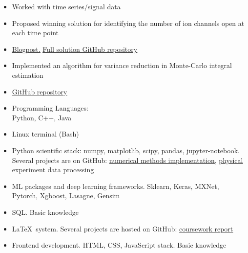 

\begin{itemize}
	\item Worked with time series/signal data
	\item Proposed winning solution for identifying the number of ion channels open at each time point
	\item \href{https://www.kaggle.com/c/liverpool-ion-switching/discussion/153991}{\underline{Blogpost.}} \href{https://github.com/stdereka/liverpool-ion-switching}{\underline{Full solution GitHub repository}}
\end{itemize}

\divider

\begin{itemize}
	\item Implemented an algorithm for variance reduction in Monte-Carlo integral estimation
	\item \href{https://github.com/stdereka/MAP361P}{\underline{GitHub repository}}
\end{itemize}

\begin{itemize}
	\item Programming Languages: \\ 
	Python, C++, Java
	\item Linux terminal (Bash)
	\item Python scientific stack: 
	numpy, matplotlib, scipy, pandas, jupyter-notebook. Several projects are on GitHub: \href{https://github.com/stdereka/calc\_math\_hometask}{\underline{numerical methods implementation},} \href{https://github.com/stdereka/PRM\_MIPT}{\underline{physical experiment data processing}}
	\item ML packages and deep learning frameworks. Sklearn, Keras, MXNet, Pytorch, Xgboost, Lasagne,
	Gensim
	\item SQL. Basic knowledge
	\item \LaTeX~system. Several projects are hosted on GitHub: \href{https://github.com/stdereka/yavor\_curse}{\underline{coursework report}}
	\item Frontend development. HTML, CSS, JavaScript stack. Basic knowledge
\end{itemize}


